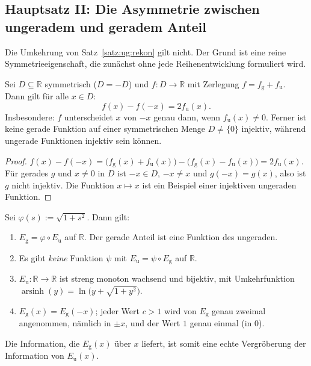 \subsection{Hauptsatz II: Die Asymmetrie zwischen ungeradem und geradem Anteil}
\label{sec:ug:haupt2}

Die Umkehrung von Satz~\ref{satz:ug:rekon} gilt nicht. Der Grund ist eine reine Symmetrieeigenschaft, die zunächst ohne jede Reihenentwicklung formuliert wird.

\begin{lemma}[Spiegelungslemma]\label{lem:ug:spiegel}
Sei $D\subseteq\mathbb{R}$ symmetrisch ($D=-D$) und $f:D\to\mathbb{R}$ mit Zerlegung $f=f_{\mathrm g}+f_{\mathrm u}$. Dann gilt für alle $x\in D$:
\[
f(x)-f(-x)=2f_{\mathrm u}(x).
\]
Insbesondere: $f$ unterscheidet $x$ von $-x$ genau dann, wenn $f_{\mathrm u}(x)\neq0$. Ferner ist keine gerade Funktion auf einer symmetrischen Menge $D\ne\{0\}$ injektiv, während ungerade Funktionen injektiv sein können.
\end{lemma}

\begin{proof}
$f(x)-f(-x)=\big(f_{\mathrm g}(x)+f_{\mathrm u}(x)\big)-\big(f_{\mathrm g}(x)-f_{\mathrm u}(x)\big)=2f_{\mathrm u}(x)$. Für gerades $g$ und $x\ne0$ in $D$ ist $-x\in D$, $-x\ne x$ und $g(-x)=g(x)$, also ist $g$ nicht injektiv. Die Funktion $x\mapsto x$ ist ein Beispiel einer injektiven ungeraden Funktion.
\end{proof}

\begin{satz}[Verfeinerungssatz]\label{satz:ug:verfein}
Sei $\varphi(s):=\sqrt{1+s^2}$. Dann gilt:
\begin{enumerate}[label=(\alph*)]
\item $E_{\mathrm g}=\varphi\circ E_{\mathrm u}$ auf $\mathbb{R}$. Der gerade Anteil ist eine Funktion des ungeraden.
\item Es gibt \emph{keine} Funktion $\psi$ mit $E_{\mathrm u}=\psi\circ E_{\mathrm g}$ auf $\mathbb{R}$.
\item $E_{\mathrm u}:\mathbb{R}\to\mathbb{R}$ ist streng monoton wachsend und bijektiv, mit Umkehrfunktion $\operatorname{arsinh}(y)=\ln\!\big(y+\sqrt{1+y^2}\big)$.
\item $E_{\mathrm g}(x)=E_{\mathrm g}(-x)$; jeder Wert $c>1$ wird von $E_{\mathrm g}$ genau zweimal angenommen, nämlich in $\pm x$, und der Wert $1$ genau einmal (in $0$).
\end{enumerate}
Die Information, die $E_{\mathrm g}(x)$ über $x$ liefert, ist somit eine echte Vergröberung der Information von $E_{\mathrm u}(x)$.
\end{satz}

